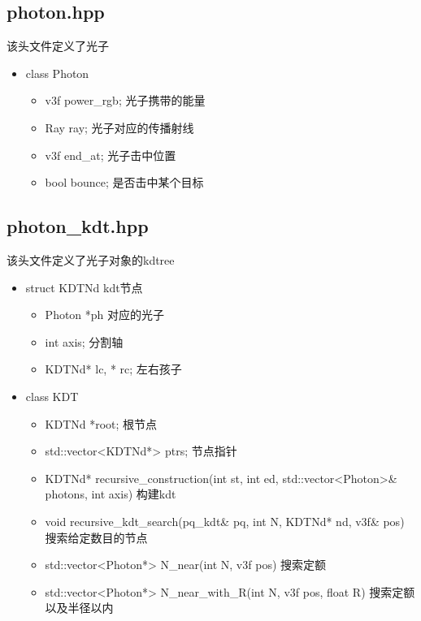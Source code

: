 \documentclass[12pt]{article}
\begin{document}
\subsection{photon.hpp}
该头文件定义了光子
\begin{itemize}
    \item class Photon
    \begin{itemize}
        \item v3f power\_rgb; 光子携带的能量
        \item Ray ray; 光子对应的传播射线
        \item v3f end\_at; 光子击中位置
        \item bool bounce; 是否击中某个目标
    \end{itemize}
\end{itemize}

\subsection{photon\_kdt.hpp}

该头文件定义了光子对象的kdtree
\begin{itemize}
    \item struct KDTNd kdt节点
    \begin{itemize}
        \item Photon *ph 对应的光子
        \item int axis; 分割轴
        \item KDTNd* lc, * rc; 左右孩子
    \end{itemize}
    \item class KDT
    \begin{itemize}
        \item KDTNd *root; 根节点
        \item std::vector<KDTNd*> ptrs; 节点指针
        \item KDTNd* recursive\_construction(int st, int ed, std::vector<Photon>\& photons, int axis) 构建kdt
        \item void recursive\_kdt\_search(pq\_kdt\& pq, int N, KDTNd* nd, v3f\& pos) 搜索给定数目的节点
        \item std::vector<Photon*> N\_near(int N, v3f pos) 搜索定额
        \item std::vector<Photon*> N\_near\_with\_R(int N, v3f pos, float R) 搜索定额以及半径以内
    \end{itemize}
\end{itemize}
\end{document}
